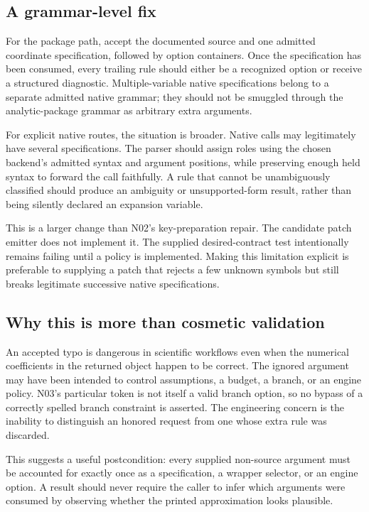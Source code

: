 \documentclass[11pt]{article}
\begin{document}
\subsection{A grammar-level fix}
For the package path, accept the documented source and one admitted coordinate specification, followed by option containers. Once the specification has been consumed, every trailing rule should either be a recognized option or receive a structured diagnostic. Multiple-variable native specifications belong to a separate admitted native grammar; they should not be smuggled through the analytic-package grammar as arbitrary extra arguments.

For explicit native routes, the situation is broader. Native calls may legitimately have several specifications. The parser should assign roles using the chosen backend's admitted syntax and argument positions, while preserving enough held syntax to forward the call faithfully. A rule that cannot be unambiguously classified should produce an ambiguity or unsupported-form result, rather than being silently declared an expansion variable.

This is a larger change than N02's key-preparation repair. The candidate patch emitter does not implement it. The supplied desired-contract test intentionally remains failing until a policy is implemented. Making this limitation explicit is preferable to supplying a patch that rejects a few unknown symbols but still breaks legitimate successive native specifications.

\subsection{Why this is more than cosmetic validation}
An accepted typo is dangerous in scientific workflows even when the numerical coefficients in the returned object happen to be correct. The ignored argument may have been intended to control assumptions, a budget, a branch, or an engine policy. N03's particular token is not itself a valid branch option, so no bypass of a correctly spelled branch constraint is asserted. The engineering concern is the inability to distinguish an honored request from one whose extra rule was discarded.

This suggests a useful postcondition: every supplied non-source argument must be accounted for exactly once as a specification, a wrapper selector, or an engine option. A result should never require the caller to infer which arguments were consumed by observing whether the printed approximation looks plausible.
\end{document}
